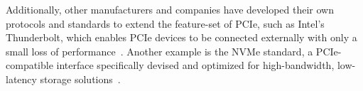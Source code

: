 Additionally, other manufacturers and companies have developed their own protocols and standards to extend the feature-set of PCIe, such as Intel's Thunderbolt, which enables PCIe devices to be connected externally with only a small loss of performance~\cite{intel_what_2022-1}. Another example is the NVMe standard, a PCIe-compatible interface specifically devised and optimized for high-bandwidth, low-latency storage solutions~\cite{kingston_understanding_2017}.





